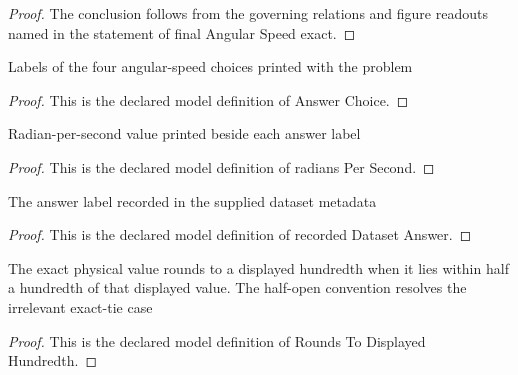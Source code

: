 \begin{proof}
  The conclusion follows from the governing relations and figure readouts named in the statement of final Angular Speed exact.
\end{proof}
\begin{definition}
  \label{def:physics:phyx-mini-0790:phyxminiproblems-problemphyxmini0790-answerchoice}
  Labels of the four angular-speed choices printed with the problem
\end{definition}
\begin{proof}
  This is the declared model definition of Answer Choice.
\end{proof}
\begin{definition}
  \label{def:physics:phyx-mini-0790:phyxminiproblems-problemphyxmini0790-answerchoice-radianspersecond}
  Radian-per-second value printed beside each answer label
\end{definition}
\begin{proof}
  This is the declared model definition of radians Per Second.
\end{proof}
\begin{definition}
  \label{def:physics:phyx-mini-0790:phyxminiproblems-problemphyxmini0790-recordeddatasetanswer}
  The answer label recorded in the supplied dataset metadata
\end{definition}
\begin{proof}
  This is the declared model definition of recorded Dataset Answer.
\end{proof}
\begin{definition}
  \label{def:physics:phyx-mini-0790:phyxminiproblems-problemphyxmini0790-roundstodisplayedhundredth}
  The exact physical value rounds to a displayed hundredth when it lies within half a hundredth of that displayed value. The half-open convention resolves the irrelevant exact-tie case
\end{definition}
\begin{proof}
  This is the declared model definition of Rounds To Displayed Hundredth.
\end{proof}
